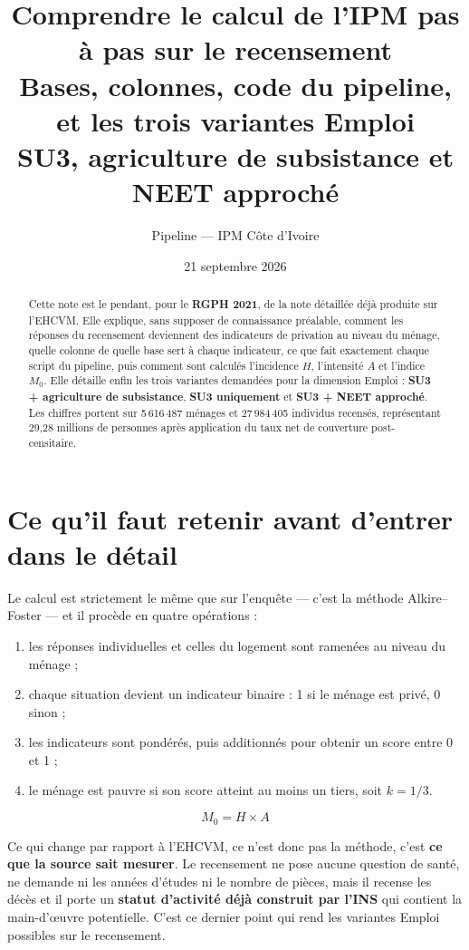 \documentclass[11pt,a4paper]{article}
\title{\bfseries Comprendre le calcul de l'IPM pas à pas sur le recensement\\[5pt]
\large Bases, colonnes, code du pipeline, et les trois variantes Emploi\\
SU3, agriculture de subsistance et NEET approché}
\author{Pipeline \col{PythonIPM} --- IPM Côte d'Ivoire}
\date{21 septembre 2026}
\begin{document}
\maketitle

\begin{abstract}
\noindent Cette note est le pendant, pour le \textbf{RGPH 2021}, de la note détaillée déjà
produite sur l'EHCVM. Elle explique, sans supposer de connaissance préalable, comment les
réponses du recensement deviennent des indicateurs de privation au niveau du ménage, quelle
colonne de quelle base sert à chaque indicateur, ce que fait exactement chaque script du
pipeline, puis comment sont calculés l'incidence $H$, l'intensité $A$ et l'indice $M_0$. Elle
détaille enfin les trois variantes demandées pour la dimension Emploi : \textbf{SU3 +
agriculture de subsistance}, \textbf{SU3 uniquement} et \textbf{SU3 + NEET approché}. Les
chiffres portent sur 5\,616\,487 ménages et 27\,984\,405 individus recensés, représentant
29,28 millions de personnes après application du taux net de couverture post-censitaire.
\end{abstract}

\tableofcontents
\newpage

\section{Ce qu'il faut retenir avant d'entrer dans le détail}

Le calcul est strictement le même que sur l'enquête --- c'est la méthode Alkire--Foster --- et
il procède en quatre opérations :

\begin{enumerate}
  \item les réponses individuelles et celles du logement sont ramenées au niveau du ménage ;
  \item chaque situation devient un indicateur binaire : 1 si le ménage est privé, 0 sinon ;
  \item les indicateurs sont pondérés, puis additionnés pour obtenir un score entre 0 et 1 ;
  \item le ménage est pauvre si son score atteint au moins un tiers, soit $k=1/3$.
\end{enumerate}

\[
  \boxed{M_0 = H \times A}
\]

Ce qui change par rapport à l'EHCVM, ce n'est donc pas la méthode, c'est \textbf{ce que la
source sait mesurer}. Le recensement ne pose aucune question de santé, ne demande ni les années
d'études ni le nombre de pièces, mais il recense les décès et il porte un \textbf{statut
d'activité déjà construit par l'INS} qui contient la main-d'{\oe}uvre potentielle. C'est ce
dernier point qui rend les variantes Emploi possibles sur le recensement.
\end{document}
